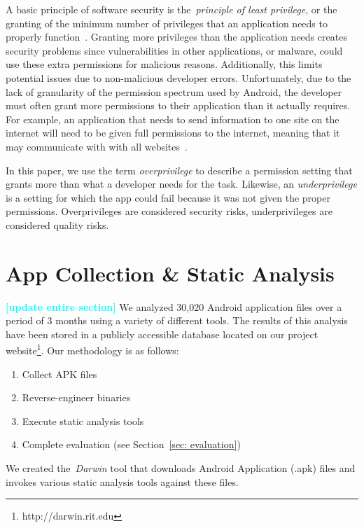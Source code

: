 \documentclass[conference]{IEEEtran}
\newcommand{\todo}[1]{\textcolor{cyan}{\textbf{[#1]}}}
\begin{document}
A basic principle of software security is the~\emph{principle of least privilege}, or the granting of the minimum number of privileges that an application needs to properly function~\cite{saltzer1975protection}. Granting more privileges than the application needs creates security problems since vulnerabilities in other applications, or malware, could use these extra permissions for malicious reasons. Additionally, this limits potential issues due to non-malicious developer errors. Unfortunately, due to the lack of granularity of the permission spectrum used by Android, the developer must often grant more permissions to their application than it actually requires. For example, an application that needs to send information to one site on the internet will need to be given full permissions to the internet, meaning that it may communicate with with all websites~\cite{jeon2011dr}.

In this paper, we use the term \emph{overprivilege} to describe a permission setting that grants more than what a developer needs for the task. Likewise, an \emph{underprivilege} is a setting for which the app could fail because it was not given the proper permissions. Overprivileges are considered security risks, underprivileges are considered quality risks.




\label{sec: dca}
\section{App Collection \& Static Analysis}
\todo{update entire section}
We analyzed 30,020 Android application files over a period of 3 months using a variety of different tools. The results of this analysis have been stored in a publicly accessible database located on our project website\footnote{http://darwin.rit.edu}. Our methodology is as follows:

\begin{enumerate}
  \item Collect APK files
  \item Reverse-engineer binaries
  \item Execute static analysis tools
  \item Complete evaluation (see Section~\ref{sec: evaluation})
\end{enumerate}

We created the~\emph{Darwin} tool that downloads Android Application (.apk) files and invokes various static analysis tools against these files.
\end{document}
